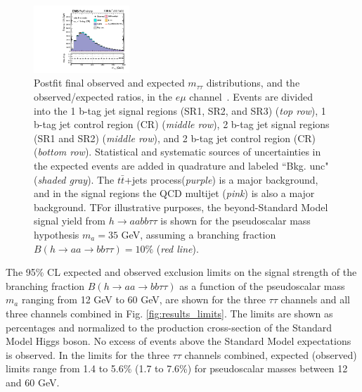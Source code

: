 \begin{figure}[ht]
\begin{center}
        \includegraphics[width=0.32\textwidth]{figures/ch-10-results/em_all_7_post_prelim-yes.pdf}
    \end{center}
    \caption[Postfit final observed and expected $m_{\tau\tau}$ distributions in the $e\mu$ channel.]{Postfit final observed and expected $m_{\tau\tau}$ distributions, and the observed/expected ratios, in the $e\mu$ channel~\cite{CMS-AN-20-213}. Events are divided into the 1 b-tag jet signal regions (SR1, SR2, and SR3) (\textit{top row}), 1 b-tag jet control region (CR) (\textit{middle row}), 2 b-tag jet signal regions (SR1 and SR2) (\textit{middle row}), and 2 b-tag jet control region (CR) (\textit{bottom row}). Statistical and systematic sources of uncertainties in the expected events are added in quadrature and labeled ``Bkg. unc" (\textit{shaded gray}). The $t\bar{t}$+jets process(\textit{purple}) is a major background, and in the signal regions the QCD multijet (\textit{pink}) is also a major background. TFor illustrative purposes, the beyond-Standard Model signal yield from $h\rightarrow aa bb\tau\tau$ is shown for the pseudoscalar mass hypothesis $m_a = 35$ GeV, assuming a branching fraction $B(h \rightarrow aa \rightarrow bb\tau\tau) = 10\%$ (\textit{red line}).}
    \label{fig:results_mtt_postfit_emall}
\end{figure}


The 95\% CL expected and observed exclusion limits on the signal strength of the branching fraction $B(h \rightarrow aa \rightarrow bb\tau\tau)$ as a function of the pseudoscalar mass $m_a$ ranging from 12 GeV to 60 GeV, are shown for the three $\tau\tau$ channels and all three channels combined in Fig. \ref{fig:results_limits}. The limits are shown as percentages and normalized to the production cross-section of the Standard Model Higgs boson. No excess of events above the Standard Model expectations is observed. In the limits for the three $\tau\tau$ channels combined, expected (observed) limits range from 1.4 to 5.6\% (1.7 to 7.6\%) for pseudoscalar masses between 12 and 60 GeV.


